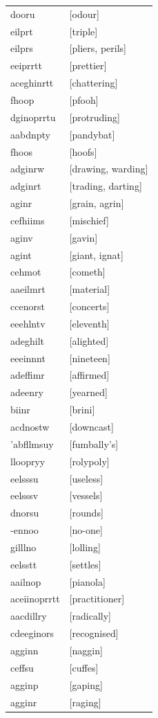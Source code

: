 \documentclass{article}
\begin{document}
\begin{tabular}{ll}
dooru & [odour] \\
eilprt & [triple] \\
eilprs & [pliers, perils] \\
eeiprrtt & [prettier] \\
aceghinrtt & [chattering] \\
fhoop & [pfooh] \\
dginoprrtu & [protruding] \\
aabdnpty & [pandybat] \\
fhoos & [hoofs] \\
adginrw & [drawing, warding] \\
adginrt & [trading, darting] \\
aginr & [grain, agrin] \\
cefhiims & [mischief] \\
aginv & [gavin] \\
agint & [giant, ignat] \\
cehmot & [cometh] \\
aaeilmrt & [material] \\
ccenorst & [concerts] \\
eeehlntv & [eleventh] \\
adeghilt & [alighted] \\
eeeinnnt & [nineteen] \\
adeffimr & [affirmed] \\
adeenry & [yearned] \\
biinr & [brini] \\
acdnostw & [downcast] \\
'abfllmsuy & [fumbally's] \\
lloopryy & [rolypoly] \\
eelsssu & [useless] \\
eelsssv & [vessels] \\
dnorsu & [rounds] \\
-ennoo & [no-one] \\
gilllno & [lolling] \\
eelsstt & [settles] \\
aailnop & [pianola] \\
aceiinoprrtt & [practitioner] \\
aacdillry & [radically] \\
cdeeginors & [recognised] \\
agginn & [naggin] \\
ceffsu & [cuffes] \\
agginp & [gaping] \\
agginr & [raging] \\

\end{tabular}
\end{document}
